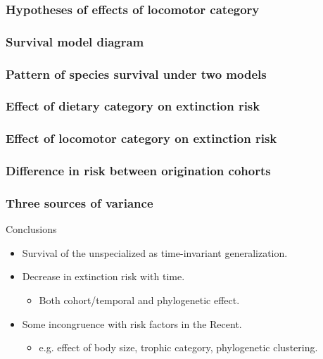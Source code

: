 \documentclass{beamer}
\begin{document}
\begin{frame}
  \frametitle{Hypotheses of effects of locomotor category}
  \begin{center}
  \end{center}
\end{frame}

\begin{frame}
  \frametitle{Survival model diagram}
  \begin{center}
  \end{center}
\end{frame}

\begin{frame}
  \frametitle{Pattern of species survival under two models}

\end{frame}

\begin{frame}
  \frametitle{Effect of dietary category on extinction risk}

\end{frame}

\begin{frame}
  \frametitle{Effect of locomotor category on extinction risk}

\end{frame}

\begin{frame}
  \frametitle{Difference in risk between origination cohorts}

\end{frame}

\begin{frame}
  \frametitle{Three sources of variance}

\end{frame}

\begin{frame}
  \begin{block}{Conclusions}
    \begin{itemize}
      \item Survival of the unspecialized as time-invariant generalization.
      \item Decrease in extinction risk with time.
        \begin{itemize}
          \item Both cohort/temporal and phylogenetic effect.
        \end{itemize}
      \item Some incongruence with risk factors in the Recent.
        \begin{itemize}
          \item e.g. effect of body size, trophic category, phylogenetic clustering.
        \end{itemize}
    \end{itemize}
  \end{block}
\end{frame}
\end{document}

